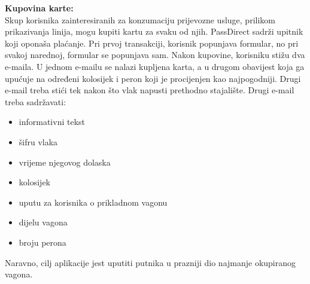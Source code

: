 \textbf{Kupovina karte:}\\
Skup korisnika zainteresiranih za konzumaciju prijevozne usluge, prilikom prikazivanja linija, mogu kupiti kartu za svaku od njih. PassDirect sadrži upitnik koji oponaša plaćanje. Pri prvoj transakciji, korisnik popunjava formular, no pri svakoj narednoj, formular se popunjava sam. Nakon kupovine, korisniku stižu dva e-maila. U jednom e-mailu se nalazi kupljena karta, a u drugom obavijest koja ga upućuje na određeni kolosijek i peron koji je procijenjen kao najpogodniji. Drugi e-mail treba stići tek nakon što vlak napusti prethodno stajalište.
Drugi e-mail treba sadržavati:
\begin{itemize}
    \item informativni tekst
    \item šifru vlaka
    \item vrijeme njegovog dolaska
    \item kolosijek
    \item uputu za korisnika o prikladnom vagonu
    \item dijelu vagona 
    \item broju perona\\
\end{itemize} 
Naravno, cilj aplikacije jest uputiti putnika u prazniji dio najmanje okupiranog vagona.\\




